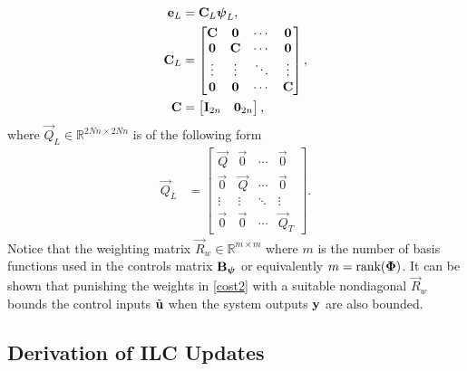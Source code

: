 \begin{equation}
\begin{aligned}
\boldsymbol{\mathrm{e}}_L &= \boldsymbol{\mathrm{C}}_L \boldsymbol{\mathrm{\psi}}_L,\\
\boldsymbol{\mathrm{C}}_L &= 
  \begin{bmatrix}
   \boldsymbol{\mathrm{C}} & \boldsymbol{\mathrm{0}} & \cdots & \boldsymbol{\mathrm{0}} \\
   \boldsymbol{\mathrm{0}} & \boldsymbol{\mathrm{C}} & \cdots & \boldsymbol{\mathrm{0}} \\
   \vdots  & \vdots  & \ddots & \vdots  \\
   \boldsymbol{\mathrm{0}} & \boldsymbol{\mathrm{0}} & \cdots & \boldsymbol{\mathrm{C}}
  \end{bmatrix}, \\
\boldsymbol{\mathrm{C}} &= \begin{bmatrix}
  \boldsymbol{\mathrm{I}}_{2n} & \boldsymbol{\mathrm{0}}_{2n}
 \end{bmatrix},
\end{aligned}
\label{outputWeights}
\end{equation}
%
\noindent where $\vec{Q}_L \in \mathbb{R}^{2Nn \times 2Nn}$ is of the following form
%
\begin{equation*}
\begin{aligned}
 \vec{Q}_L &= 
 \begin{bmatrix}
  \vec{Q} & \vec{0} & \cdots & \vec{0} \\
  \vec{0} & \vec{Q} & \cdots & \vec{0} \\
  \vdots  & \vdots  & \ddots & \vdots  \\
  \vec{0} & \vec{0} & \cdots & \vec{Q}_T
 \end{bmatrix}.
\end{aligned}
\end{equation*}
%
Notice that the weighting matrix $\vec{R}_w \in \mathbb{R}^{m \times m}$ where $m$ is the number of basis functions used in the controls matrix $\boldsymbol{\mathrm{B}}_{\boldsymbol{\mathrm{\psi}}}$ or equivalently $m = \text{rank}(\boldsymbol{\mathrm{\Phi}})$. It can be shown that punishing the weights in \eqref{cost2} with a suitable nondiagonal $\vec{R}_w$ bounds the control inputs $\tilde{\boldsymbol{\mathrm{u}}}$ when the system outputs $\boldsymbol{\mathrm{y}}$ are also bounded.


\subsection{Derivation of ILC Updates}

